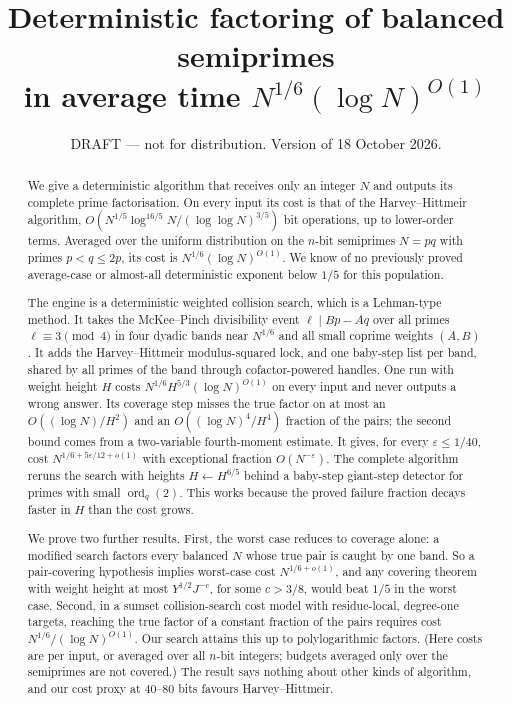 \documentclass[11pt]{amsart}
\title[Deterministic factoring of balanced semiprimes on average]{Deterministic factoring of
balanced semiprimes\\ in average time $N^{1/6}(\log N)^{O(1)}$}
\author{}
\date{DRAFT --- not for distribution. Version of 18 October 2026.}
\theoremstyle{definition}
\newcommand{\ord}{\operatorname{ord}}
\begin{document}
\begin{abstract}
We give a deterministic algorithm that receives only an integer $N$ and outputs its complete
prime factorisation. On every input its cost is that of the Harvey--Hittmeir algorithm,
$O(N^{1/5}\log^{16/5}N/(\log\log N)^{3/5})$ bit operations, up to lower-order terms. Averaged
over the uniform distribution on the $n$-bit semiprimes $N=pq$ with primes $p<q\le2p$, its
cost is $N^{1/6}(\log N)^{O(1)}$. We know of no previously proved average-case or almost-all
deterministic exponent below $1/5$ for this population.

The engine is a deterministic weighted collision search, which is a Lehman-type method. It
takes the McKee--Pinch divisibility event $\ell\mid Bp-Aq$ over all primes $\ell\equiv3\pmod
4$ in four dyadic bands near $N^{1/6}$ and all small coprime weights $(A,B)$. It adds the
Harvey--Hittmeir modulus-squared lock, and one baby-step list per band, shared by all primes
of the band through cofactor-powered handles. One run with weight height $H$ costs
$N^{1/6}H^{5/3}(\log N)^{O(1)}$ on every input and never outputs a wrong answer. Its coverage
step misses the true factor on at most an $O((\log N)/H^2)$ and an $O((\log N)^4/H^4)$ fraction
of the pairs; the second bound comes from a two-variable fourth-moment estimate. It gives, for every
$\varepsilon\le1/40$, cost $N^{1/6+5\varepsilon/12+o(1)}$ with exceptional fraction
$O(N^{-\varepsilon})$. The complete algorithm reruns the search with heights
$H\leftarrow H^{6/5}$ behind a baby-step giant-step detector for primes with small
$\ord_q(2)$. This works because the proved failure fraction decays faster in $H$ than the cost
grows.

We prove two further results. First, the worst case reduces to coverage alone: a modified
search factors every balanced $N$ whose true pair is caught by one band. So a pair-covering
hypothesis implies worst-case cost $N^{1/6+o(1)}$, and any covering theorem with weight
height at most $Y^{1/2}J^{-c}$, for some $c>3/8$, would beat $1/5$ in the worst case. Second, in a sumset
collision-search cost model with residue-local, degree-one targets, reaching the true factor
of a constant fraction of the pairs requires cost $N^{1/6}/(\log N)^{O(1)}$. Our search attains this up to polylogarithmic factors.
(Here costs are per input, or averaged over all $n$-bit integers; budgets averaged only over the
semiprimes are not covered.) The result says nothing about other kinds of
algorithm, and our cost proxy at 40--80 bits favours Harvey--Hittmeir.
\end{abstract}
\end{document}
